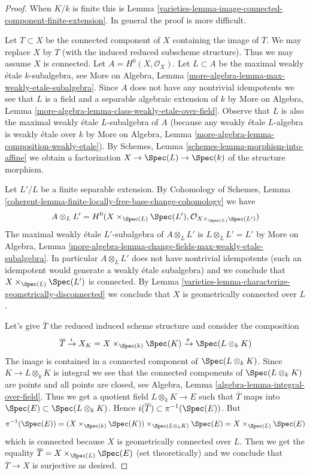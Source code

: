 \begin{proof}

When $K/k$ is finite this is
Lemma \ref{varieties-lemma-image-connected-component-finite-extension}.
In general the proof is more difficult.

\medskip\noindent
Let $T \subset X$ be the connected component of $X$ containing
the image of $\overline{T}$. We may replace $X$ by $T$
(with the induced reduced subscheme structure). Thus we
may assume $X$ is connected. Let $A = H^0(X, \mathcal{O}_X)$.
Let $L \subset A$ be the maximal weakly \'etale $k$-subalgebra, see
More on Algebra, Lemma \ref{more-algebra-lemma-max-weakly-etale-subalgebra}.
Since $A$ does not have any nontrivial idempotents we see
that $L$ is a field and a separable algebraic extension of $k$ by
More on Algebra, Lemma \ref{more-algebra-lemma-class-weakly-etale-over-field}.
Observe that $L$ is also the maximal weakly \'etale $L$-subalgebra of $A$
(because any weakly \'etale $L$-algebra is weakly \'etale over $k$
by More on Algebra, Lemma \ref{more-algebra-lemma-composition-weakly-etale}).
By Schemes, Lemma \ref{schemes-lemma-morphism-into-affine}
we obtain a factorization $X \to \Spec(L) \to \Spec(k)$
of the structure morphism.

\medskip\noindent
Let $L'/L$ be a finite separable extension. By
Cohomology of Schemes, Lemma
\ref{coherent-lemma-finite-locally-free-base-change-cohomology}
we have
$$
A \otimes_L L' =
H^0(X \times_{\Spec(L)} \Spec(L'), \mathcal{O}_{X \times_{\Spec(L)} \Spec(L')})
$$
The maximal weakly \'etale $L'$-subalgebra of $A \otimes_L L'$
is $L \otimes_L L' = L'$ by More on Algebra, Lemma
\ref{more-algebra-lemma-change-fields-max-weakly-etale-subalgebra}.
In particular $A \otimes_L L'$ does not have nontrivial idempotents
(such an idempotent would generate a weakly \'etale subalgebra)
and we conclude that $X \times_{\Spec(L)} \Spec(L')$ is connected.
By Lemma \ref{varieties-lemma-characterize-geometrically-disconnected}
we conclude that $X$ is geometrically connected over $L$.

\medskip\noindent
Let's give $\overline{T}$ the reduced induced scheme structure
and consider the composition
$$
\overline{T} \xrightarrow{i} X_K = X \times_{\Spec(k)} \Spec(K)
\xrightarrow{\pi}
\Spec(L \otimes_k K)
$$
The image is contained in a connected component of $\Spec(L \otimes_k K)$.
Since $K \to L \otimes_k K$ is integral we see that
the connected components of $\Spec(L \otimes_k K)$
are points and all points are closed, see
Algebra, Lemma \ref{algebra-lemma-integral-over-field}.
Thus we get a quotient field $L \otimes_k K \to E$
such that $\overline{T}$ maps into $\Spec(E) \subset \Spec(L \otimes_k K)$.
Hence $i(\overline{T}) \subset \pi^{-1}(\Spec(E))$. But
$$
\pi^{-1}(\Spec(E)) =
(X \times_{\Spec(k)} \Spec(K)) \times_{\Spec(L \otimes_k K)} \Spec(E) =
X \times_{\Spec(L)} \Spec(E)
$$
which is connected because $X$ is geometrically connected over $L$.
Then we get the equality
$\overline{T} = X \times_{\Spec(L)} \Spec(E)$ (set theoretically)
and we conclude that $\overline{T} \to X$ is surjective as desired.
\end{proof}

